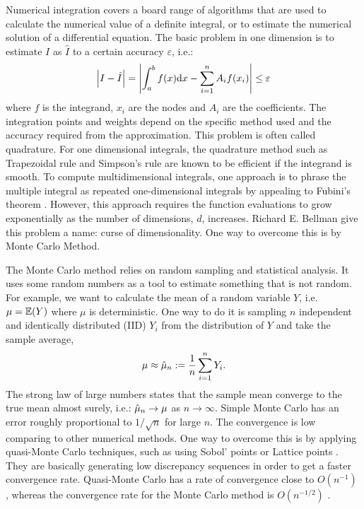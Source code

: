 \documentclass{iitthesis}
\theoremstyle{definition}
\begin{document}

Numerical integration covers a board range of algorithms that are used to calculate the numerical value of a definite integral, or to estimate the numerical solution of a differential equation.
The basic problem in one dimension is to estimate $I$ as $\hat{I}$ to a certain accuracy $\varepsilon$, i.e.:
\begin{align}
\left \lvert I -\hat{I} \right \rvert  = \left \lvert \int_a^b f(x){\rm d} x -\sum_{i=1}^nA_i f(x_i) \right \rvert \leq \varepsilon
\end{align}
where $f$ is the integrand, $x_i$ are the nodes and $A_i$ are the coefficients. The integration points and weights depend on the specific method used and the accuracy required from the approximation. This problem is often called quadrature. For one dimensional integrals, the quadrature method such as Trapezoidal rule and Simpson's rule are known to be efficient if the integrand is smooth. To compute multidimensional integrals, one approach is to phrase the multiple integral as repeated one-dimensional integrals by appealing to Fubini's theorem \cite{Fubini1907}. However, this approach requires the function evaluations to grow exponentially as the number of dimensions, $d$, increases. Richard E. Bellman give this problem a name: curse of dimensionality. One way to overcome this is by Monte Carlo Method.


The Monte Carlo method relies on random sampling and statistical analysis. It uses some random numbers as a tool to estimate something that is not random. For example, we want to calculate the mean of a random variable $Y$, i.e. $\mu=\mathbb{E}(Y)$ where $\mu$ is deterministic.  One way to do it is sampling $n$ independent and identically distributed (IID) $Y_i$ from the distribution of $Y$ and take the sample average, 
$$\mu \approx \hat{\mu}_n :=\frac1n\sum_{i=1}^nY_i.$$
The strong law of large numbers states that the sample mean converge to the true mean almost surely, i.e.: $\hat{\mu}_n \to \mu$ as $n \to \infty$. Simple Monte Carlo has an error roughly proportional to $1/\sqrt{n}$ for large $n$. The convergence is low comparing to other numerical methods. One way to overcome this is by applying quasi-Monte Carlo techniques, such as using Sobol' points \cite{Sobol67, Sobol76} or Lattice points \cite{Glasserman03}. They are basically generating low discrepancy sequences in order to get a faster convergence rate. Quasi-Monte Carlo has a rate of convergence close to $O(n^{-1})$ \cite{Glasserman03}, whereas the convergence rate for the Monte Carlo method is $O(n^{-1/2})$ \cite{Glasserman03}.
\end{document}
